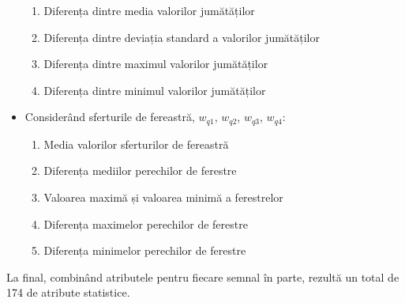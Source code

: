 \begin{itemize}
	\begin{enumerate}
		\item Diferența dintre media valorilor jumătăților
		\item Diferența dintre deviația standard a valorilor jumătăților
		\item Diferența dintre maximul valorilor jumătăților
		\item Diferența dintre minimul valorilor jumătăților
	\end{enumerate}
	\item Considerând sferturile de fereastră, $w_{q1}$, $w_{q2}$, $w_{q3}$, $w_{q4}$:
		\begin{enumerate}
		\item Media valorilor sferturilor de fereastră
		\item Diferența mediilor perechilor de ferestre
		\item Valoarea maximă și valoarea minimă a ferestrelor
		\item Diferența maximelor perechilor de ferestre
		\item Diferența minimelor perechilor de ferestre
	\end{enumerate}
\end{itemize}

La final, combinând atributele pentru fiecare semnal în parte, rezultă un total de 174 de atribute statistice.

